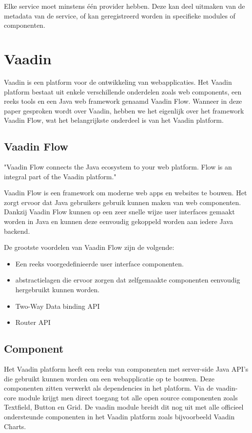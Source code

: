 Elke service moet minstens één provider hebben. Deze kan deel uitmaken van de metadata van de service, of kan geregistreerd worden in specifieke modules of componenten. 

\section{Vaadin}
Vaadin is een platform voor de ontwikkeling van webapplicaties. Het Vaadin platform bestaat uit enkele verschillende onderdelen zoals web components, een reeks tools en een Java web framework genaamd Vaadin Flow. Wanneer in deze paper gesproken wordt over Vaadin, hebben we het eigenlijk over het framework Vaadin Flow, wat het belangrijkste onderdeel is van het Vaadin platform. 
\subsection{Vaadin Flow}

"Vaadin Flow connects the Java ecosystem to your web platform. Flow is an integral part of the Vaadin platform." \autocite{Vaadin2019} 

Vaadin Flow is een framework om moderne web apps en websites te bouwen. Het zorgt ervoor dat Java gebruikers gebruik kunnen maken van web componenten. Dankzij Vaadin Flow kunnen op een zeer snelle wijze user interfaces gemaakt worden in Java en kunnen deze eenvoudig gekoppeld worden aan iedere Java backend.

De grootste voordelen van Vaadin Flow zijn de volgende:
\begin{itemize}
	\item Een reeks voorgedefinieerde user interface componenten.
	\item abstractielagen die ervoor zorgen dat zelfgemaakte componenten eenvoudig hergebruikt kunnen worden.
	\item Two-Way Data binding API
	\item Router API
\end{itemize}

\subsection{Component}
Het Vaadin platform heeft een reeks van componenten met server-side Java API's die gebruikt kunnen worden om een webapplicatie op te bouwen. Deze componenten zitten verwerkt als dependencies in het platform. Via de vaadin-core module krijgt men direct toegang tot alle open source componenten zoals Textfield, Button en Grid. De vaadin module breidt dit nog uit met alle officieel ondersteunde componenten in het Vaadin platform zoals bijvoorbeeld Vaadin Charts. 

